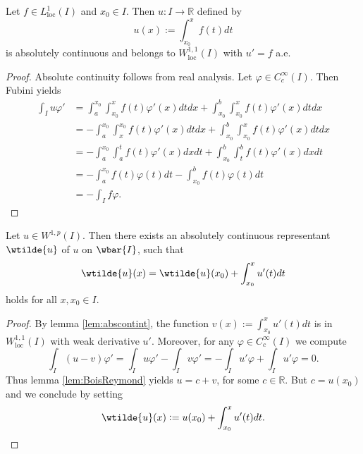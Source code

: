 \begin{lemma}
	\label{lem:abscontint}
	Let $f \in L^1_{\mathrm{loc}}(I)$ and $x_0 \in I$. Then $u : I \to \mathbb{R}$ defined by
	\begin{equation*}
		u(x) := \int_{x_0}^x f(t)dt
	\end{equation*}
	\noindent is absolutely continuous and belongs to $W^{1,1}_{\mathrm{loc}}(I)$ with $u' = f$ a.e.
\end{lemma}

\begin{proof}
	Absolute continuity follows from real analysis. Let $\varphi \in C^\infty_c(I)$. Then Fubini yields
	\begin{align*}
		\int_I u\varphi' &= \int_a^{x_0}\int_{x_0}^x f(t)\varphi'(x)dtdx + \int_{x_0}^b \int_{x_0}^x f(t)\varphi'(x)dtdx\\
		&= -\int_a^{x_0}\int_x^{x_0} f(t)\varphi'(x)dtdx + \int_{x_0}^b \int_{x_0}^x f(t)\varphi'(x)dtdx\\
		&= -\int_a^{x_0}\int_a^t f(t)\varphi'(x)dxdt + \int_{x_0}^b \int_t^b f(t)\varphi'(x)dxdt\\
		&= -\int_a^{x_0} f(t)\varphi(t)dt - \int_{x_0}^b f(t)\varphi(t)dt\\
		&= -\int_I f \varphi.
	\end{align*}
\end{proof}

\begin{theorem}
	\label{thm:W1p}
	Let $u \in W^{1,p}(I)$. Then there exists an absolutely continuous representant $\wtilde{u}$ of $u$ on $\wbar{I}$, such that
	\begin{equation*}
		\wtilde{u}(x) = \wtilde{u}(x_0) + \int_{x_0}^x u'(t)dt
	\end{equation*}
	\noindent holds for all $x,x_0 \in I$.
\end{theorem}

\begin{proof}
	By lemma \ref{lem:abscontint}, the function $v(x) := \int_{x_0}^x u'(t)dt$ is in $W^{1,1}_{\mathrm{loc}}(I)$ with weak derivative $u'$. Moreover, for any $\varphi \in C^\infty_c(I)$ we compute
	\begin{equation*}
		\int_I (u - v)\varphi' = \int_I u\varphi' - \int_I v\varphi' = -\int_I u'\varphi + \int_I u'\varphi = 0.
	\end{equation*}
	Thus lemma \ref{lem:BoisReymond} yields $u = c + v$, for some $c \in \mathbb{R}$. But $c = u(x_0)$ and we conclude by setting
	\begin{equation*}
		\wtilde{u}(x) := u(x_0) + \int_{x_0}^x u'(t) dt.
	\end{equation*}
\end{proof}

